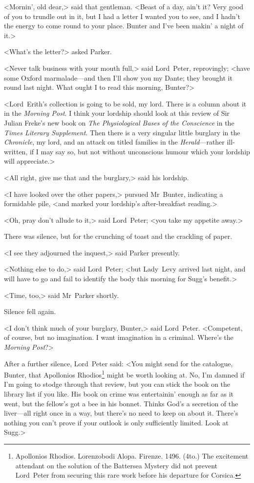 <Mornin', old dear,> said that gentleman. <Beast of a day, ain't it? Very good of you to trundle out in it, but I had a letter I wanted you to see, and I hadn't the energy to come round to your place. Bunter and I've been makin' a night of it.>

<What's the letter?> asked Parker.

<Never talk business with your mouth full,> said Lord~Peter, reprovingly; <have some Oxford marmalade—and then I'll show you my Dante; they brought it round last night. What ought I to read this morning, Bunter?>

<Lord~Erith's collection is going to be sold, my lord. There is a column about it in the \textit{Morning Post}. I think your lordship should look at this review of Sir Julian Freke's new book on \textit{The Physiological Bases of the Conscience} in the \textit{Times Literary Supplement}. Then there is a very singular little burglary in the \textit{Chronicle}, my lord, and an attack on titled families in the \textit{Herald}—rather ill-written, if I may say so, but not without unconscious humour which your lordship will appreciate.>

<All right, give me that and the burglary,> said his lordship.

<I have looked over the other papers,> pursued Mr~Bunter, indicating a formidable pile, <and marked your lordship's after-breakfast reading.>

<Oh, pray don't allude to it,> said Lord~Peter; <you take my appetite away.>

There was silence, but for the crunching of toast and the crackling of paper.

<I see they adjourned the inquest,> said Parker presently.

<Nothing else to do,> said Lord~Peter; <but Lady~Levy arrived last night, and will have to go and fail to identify the body this morning for Sugg's benefit.>

<Time, too,> said Mr~Parker shortly.

Silence fell again.

<I don't think much of your burglary, Bunter,> said Lord~Peter. <Competent, of course, but no imagination. I want imagination in a criminal. Where's the \textit{Morning Post}?>

After a further silence, Lord~Peter said: <You might send for the catalogue, Bunter, that Apollonios Rhodios\footnote{Apollonios Rhodios. Lorenzobodi Alopa. Firenze. 1496. (4to.) The excitement attendant on the solution of the Battersea Mystery did not prevent Lord~Peter from securing this rare work before his departure for Corsica.} might be worth looking at. No, I'm damned if I'm going to stodge through that review, but you can stick the book on the library list if you like. His book on crime was entertainin' enough as far as it went, but the fellow's got a bee in his bonnet. Thinks God's a secretion of the liver—all right once in a way, but there's no need to keep on about it. There's nothing you can't prove if your outlook is only sufficiently limited. Look at Sugg.>

